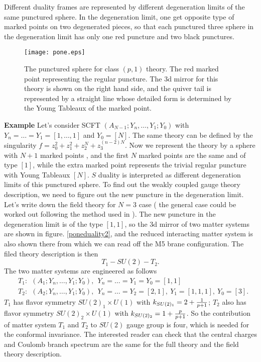 \documentclass[a4paper,11pt]{article}
\begin{document}
Different duality frames are represented by different degeneration limits of the same punctured sphere. In the degeneration limit, one get opposite type of marked points on two degenerated pieces, 
so that each punctured three sphere in the degeneration limit  has only one red  puncture and two black punctures. 

\begin{figure}[h]
\centering
  \texttt{[image: pone.eps]}
  \caption{The punctured sphere for class $(p,1)$ theory. The red marked point representing the regular puncture. The 3d mirror for this theory is shown on  the right hand side, and 
  the quiver tail is represented by a straight line whose detailed form is determined by the Young Tableaux of the marked point.}
  \label{ponemarked}
\end{figure}



\textbf{Example}
Let's  consider SCFT $(A_{N-1}; Y_{n}, \ldots, Y_1; Y_0)$ with $Y_n=\ldots=Y_1=[1,\ldots, 1]$ and $Y_0=[N]$. 
The same theory can be defined by the singularity $f=z_0^2+z_1^2+z_2^N+z_3^{(n-2)N}$. Now we represent the theory by a sphere with 
$N+1$ marked points , and the first $N$ marked points are the same and of type $[1]$, while the extra marked point represents the trivial regular puncture with Young Tableaux $[N]$. 
$S$ duality is interpreted as different degeneration limits of this punctured sphere.  To find out the weakly coupled gauge theory description, we 
need to figure out the new puncture in the degeneration limit.  Let's write down the field theory for $N=3$ case ( the general case 
could be worked out following the method used in \cite{Nanopoulos:2010ga}). The new puncture in the degeneration limit is of the type $[1,1]$, so the 3d mirror of two matter systems 
are shown in figure. \ref{poneduality2}, and the reduced interacting matter system is also shown there from which we can read off the M5 brane configuration.  The filed theory description is then
\begin{equation}
T_1-SU(2)-T_2.
\end{equation}
The two matter systems are engineered as follows
\begin{align}
&T_1:~~(A_1; Y_n,\ldots, Y_1; Y_0),~~Y_n=\ldots=Y_1=Y_0=[1,1]  \nonumber\\
&T_2:~~(A_2; Y_n,\ldots, Y_1; Y_0),~~Y_n=\ldots=Y_2=[2,1],~Y_1=[1,1,1],~Y_0=[3].
\end{align}
$T_1$ has flavor symmetry $SU(2)_1\times U(1)$ with $k_{SU(2)_1}=2+{1\over p+1}$;  $T_2$ also has flavor symmetry $SU(2)_2\times U(1)$ with $k_{SU(2)_2}=1+{p\over p+1}$.
So the contribution of matter system $T_1$ and $T_2$ to $SU(2)$ gauge group is four, which is needed for the conformal invariance. The interested reader 
can check that the central charges and Coulomb branch spectrum are the same for the full theory and the field theory description.
\end{document}
